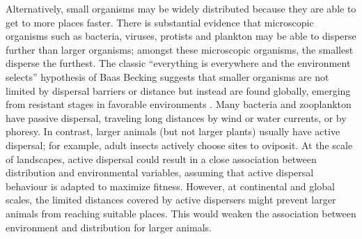 Alternatively, small organisms may be widely distributed because they
are able to get to more places faster. There is substantial evidence
that microscopic organisms such as bacteria, viruses, protists and
plankton may be able to disperse further than larger organisms; amongst
these microscopic organisms, the smallest disperse the furthest. The
classic ``everything is everywhere and the environment selects''
hypothesis of Baas Becking \citeyearpar{BaasBecking1934} suggests that
smaller organisms are not limited by dispersal barriers or distance but
instead are found globally, emerging from resistant stages in favorable
environments \citep{Huszar2015}. Many bacteria and zooplankton have
passive dispersal, traveling long distances by wind or water currents,
or by phoresy. In contrast, larger animals (but not larger plants)
usually have active dispersal; for example, adult insects actively
choose sites to oviposit. At the scale of landscapes, active dispersal
could result in a close association between distribution and
environmental variables, assuming that active dispersal behaviour is
adapted to maximize fitness. However, at continental and global scales,
the limited distances covered by active dispersers might prevent larger
animals from reaching suitable places. This would weaken the association
between environment and distribution for larger animals.

